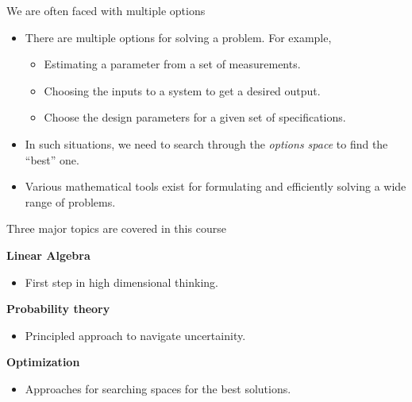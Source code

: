 \documentclass[aspectratio=169]{beamer}
\let\olditem\item
\renewcommand{\item}{\setlength{\itemsep}{\fill}\olditem}
\begin{document}
\begin{frame}{We are often faced with multiple options}
\begin{itemize}
  \item There are multiple options for solving a problem. For example,
  \begin{itemize}
    \item Estimating a parameter from a set of measurements.
    \item Choosing the inputs to a system to get a desired output. 
    \item Choose the design parameters for a given set of specifications.
  \end{itemize}
  \vspace{0.2cm}
  \item In such situations, we need to search through the \textit{options space} to find the ``best'' one.
  \vspace{0.2cm}
  \item Various mathematical tools exist for formulating and efficiently solving a wide range of problems.
\end{itemize}
\end{frame}

\begin{frame}{Three major topics are covered in this course}
  \begin{Large}
    {\textbf{Linear Algebra}}
  \end{Large}
  \begin{itemize}
    \item First step in high dimensional thinking.
  \end{itemize}
  \vspace{0.75cm}
  
  \begin{Large}
    {\textbf{Probability theory}}
  \end{Large}
  \begin{itemize}
    \item Principled approach to navigate uncertainity.
  \end{itemize}
  \vspace{0.75cm}
  
  \begin{Large}
    {\textbf{Optimization}}
  \end{Large}
  \begin{itemize}
    \item Approaches for searching spaces for the best solutions.
  \end{itemize}
\end{frame}
\end{document}
